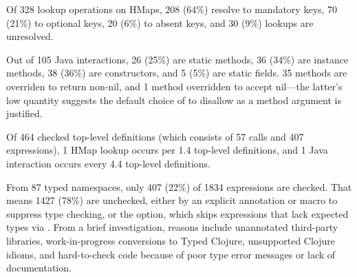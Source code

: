 Of 328 lookup operations on HMaps,
208 (64\%) resolve to mandatory keys,
70 (21\%) to optional keys,
20 (6\%) to absent keys, and
30 (9\%) lookups are unresolved.








Out of 105 Java interactions, 26 (25\%) are static methods, 36 (34\%)
are instance methods, 38 (36\%) are constructors, and 5 (5\%) are static
fields. 35 methods are overriden to return non-nil, and 1 method 
overridden to accept nil---the latter's low quantity suggests
the default choice of \coretyped{} to disallow  as a method argument
is justified.

Of 464 checked top-level definitions (which consists of
57  calls and 407  expressions),
1 HMap lookup occurs per 1.4 top-level definitions,
and 1 Java interaction occurs every 4.4 top-level definitions.

From 87 typed namespaces,
only 407 (22\%) of 1834  expressions are checked.
That means 1427 (78\%) are unchecked, either by an explicit  annotation
or  macro to suppress type checking,
or the  option, which skips  expressions
that lack expected types via .
From a brief investigation,
reasons include unannotated third-party libraries,
work-in-progress conversions to Typed Clojure,
unsupported Clojure idioms, 
and hard-to-check code 
because of poor type error messages or lack of documentation.

